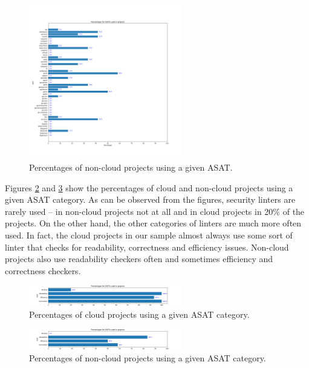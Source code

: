 \documentclass{seal_article}
\begin{document}
\begin{figure}
\centering
    \includegraphics[width=0.6\textwidth]{img/non-cloud-projects.png}
    \caption{Percentages of non-cloud projects using a given ASAT.}
    \label{fig:perc-noncloudapps}
\end{figure}

Figures \ref{fig:perc-cloudapps-categories} and \ref{fig:perc-noncloudapps-categories} show the percentages of cloud and non-cloud projects using a given ASAT category. As can be observed from the figures, security linters are rarely used -- in non-cloud projects not at all and in cloud projects in 20\% of the projects. On the other hand, the other categories of linters are much more often used. In fact, the cloud projects in our sample almost always use some sort of linter that checks for readability, correctness and efficiency issues. Non-cloud projects also use readability checkers often and sometimes efficiency and correctness checkers.

\begin{figure}
\centering
    \includegraphics[width=0.6\textwidth]{img/cloud-projects-categories.png}
    \caption{Percentages of cloud projects using a given ASAT category.}
    \label{fig:perc-cloudapps-categories}
\end{figure}

\begin{figure}
\centering
    \includegraphics[width=0.6\textwidth]{img/non-cloud-projects-categories.png}
    \caption{Percentages of non-cloud projects using a given ASAT category.}
    \label{fig:perc-noncloudapps-categories}
\end{figure}
\end{document}
